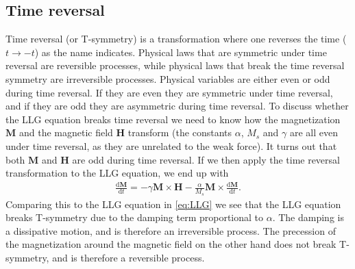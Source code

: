 \subsection{Time reversal}
Time reversal (or T-symmetry) is a transformation where one reverses the time ($t \rightarrow -t$) as the name indicates. Physical laws that are symmetric under time reversal are reversible processes, while physical laws that break the time reversal symmetry are irreversible processes. Physical variables are either even or odd during time reversal. If they are even they are symmetric under time reversal, and if they are odd they are asymmetric during time reversal. To discuss whether the LLG equation breaks time reversal we need to know how the magnetization $\mathbold{M}$ and the magnetic field $\mathbold{H}$ transform (the constants $\alpha$, $M_s$ and $\gamma$ are all even under time reversal, as they are unrelated to the weak force). It turns out that both $\mathbold{M}$ and $\mathbold{H}$ are odd during time reversal. If we then apply the time reversal transformation to the LLG equation, we end up with
\begin{align}
\label{eq:LLG_TR}
\frac{\textrm{d}\mathbold{M}}{\textrm{d}t} = -\gamma\mathbold{M}\times\mathbold{H}-\frac{\alpha}{M_s}\mathbold{M}\times\frac{\textrm{d}\mathbold{M}}{\textrm{d}t}.
\end{align}
Comparing this to the LLG equation in \eqref{eq:LLG} we see that the LLG equation breaks T-symmetry due to the damping term proportional to $\alpha$. The damping is a dissipative motion, and is therefore an irreversible process. The precession of the magnetization around the magnetic field on the other hand does not break T-symmetry, and is therefore a reversible process.

